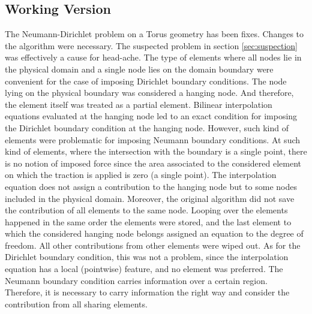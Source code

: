 \documentclass[a4paper,12pt]{article}
\begin{document}
\subsection{Working Version}
The Neumann-Dirichlet problem on a Torus geometry has been fixes. Changes to the algorithm were necessary. The suspected problem in section \ref{sec:suspection} was effectively a cause for head-ache. The type of elements where all nodes lie in the physical domain and a single node lies on the domain boundary were convenient for the case of imposing Dirichlet boundary conditions. The node lying on the physical boundary was considered a hanging node. And therefore, the element itself was treated as a partial element. Bilinear interpolation equations evaluated at the hanging node led to an exact condition for imposing the Dirichlet boundary condition at the hanging node. However, such kind of elements were problematic for imposing Neumann boundary conditions. At such kind of elements, where the intersection with the boundary is a single point, there is no notion of imposed force since the area associated to the considered element on which the traction is applied is zero (a single point). The interpolation equation does not assign a contribution to the hanging node but to some nodes included in the physical domain. Moreover, the original algorithm did not save the contribution of all elements to the same node. Looping over the elements happened in the same order the elements were stored, and the last element to which the considered hanging node belongs assigned an equation to the degree of freedom. All other contributions from other elements were wiped out. As for the Dirichlet boundary condition, this was not a problem, since the interpolation equation has a local (pointwise) feature, and no element was preferred. The Neumann boundary condition carries information over a certain region. Therefore, it is necessary to carry information the right way and consider the contribution from all sharing elements. 
\end{document}
